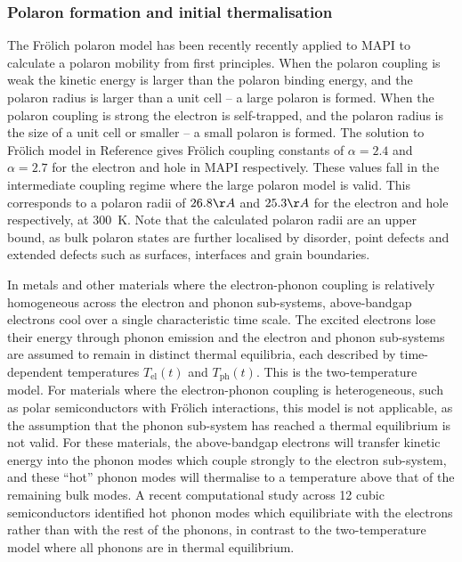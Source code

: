 \subsubsection{Polaron formation and initial thermalisation}
The Fr\"{o}lich polaron model has been recently recently applied to MAPI to calculate a polaron mobility from first principles.\autocite{Frost2017b} %
When the polaron coupling is weak the kinetic energy is larger than the polaron binding energy, and the polaron radius is larger than a unit cell -- a large polaron is formed. When the polaron coupling is strong the electron is self-trapped, and the polaron radius is the size of a unit cell or smaller -- a small polaron is formed. The solution to Fr\"{o}lich model in Reference \cite{Frost2017b} gives Fr\"{o}lich coupling constants of $\alpha=2.4$ and $\alpha=2.7$ for the electron and hole in MAPI respectively. These values fall in the intermediate coupling regime where the large polaron model is valid. This corresponds to a polaron radii of $26.8\AA$ and $25.3\AA$ for the electron and hole respectively, at \SI{300}{\K}.
Note that the calculated polaron radii are an upper bound, as bulk polaron states are further localised by disorder, point defects and extended defects such as surfaces, interfaces and grain boundaries.

In metals and other materials where the electron-phonon coupling is relatively homogeneous across the electron and phonon sub-systems, above-bandgap electrons cool over a single characteristic time scale.
The excited electrons lose their energy through phonon emission and the electron and phonon sub-systems are assumed to remain in distinct thermal equilibria, each described by time-dependent temperatures $T_{\mathrm{el}}(t)$ and $T_{\mathrm{ph}}(t)$. This is the two-temperature model.\autocite{Kaganov1955}
For materials where the electron-phonon coupling is heterogeneous, such as polar semiconductors with Fr\"{o}lich interactions, this model is not applicable, as the assumption that the phonon sub-system has reached a thermal equilibrium is not valid. 
For these materials, the above-bandgap electrons will transfer kinetic energy into the phonon modes which couple strongly to the electron sub-system, and these ``hot'' phonon modes will thermalise to a temperature above that of the remaining bulk modes. A recent computational study across 12 cubic semiconductors identified hot phonon modes which equilibriate with the electrons rather than with the rest of the phonons, in contrast to the two-temperature model where all phonons are in thermal equilibrium.\autocite{Sadasivam2017}

